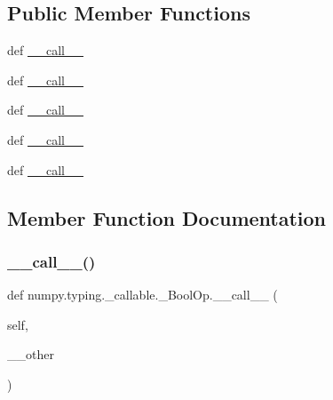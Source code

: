 \subsection*{Public Member Functions}
\begin{DoxyCompactItemize}
\item 
def \hyperlink{classnumpy_1_1typing_1_1__callable_1_1__BoolOp_af99dcaaa1aa2881d3ed4ad2f8663d85e}{\+\_\+\+\_\+call\+\_\+\+\_\+}
\item 
def \hyperlink{classnumpy_1_1typing_1_1__callable_1_1__BoolOp_af99dcaaa1aa2881d3ed4ad2f8663d85e}{\+\_\+\+\_\+call\+\_\+\+\_\+}
\item 
def \hyperlink{classnumpy_1_1typing_1_1__callable_1_1__BoolOp_af99dcaaa1aa2881d3ed4ad2f8663d85e}{\+\_\+\+\_\+call\+\_\+\+\_\+}
\item 
def \hyperlink{classnumpy_1_1typing_1_1__callable_1_1__BoolOp_af99dcaaa1aa2881d3ed4ad2f8663d85e}{\+\_\+\+\_\+call\+\_\+\+\_\+}
\item 
def \hyperlink{classnumpy_1_1typing_1_1__callable_1_1__BoolOp_af99dcaaa1aa2881d3ed4ad2f8663d85e}{\+\_\+\+\_\+call\+\_\+\+\_\+}
\end{DoxyCompactItemize}


\subsection{Member Function Documentation}
\mbox{\label{classnumpy_1_1typing_1_1__callable_1_1__BoolOp_af99dcaaa1aa2881d3ed4ad2f8663d85e}} 
\subsubsection{\texorpdfstring{\+\_\+\+\_\+call\+\_\+\+\_\+()}{\_\_call\_\_()}\hspace{0.1cm}{\footnotesize\ttfamily [1/5]}}
{\footnotesize\ttfamily def numpy.\+typing.\+\_\+callable.\+\_\+\+Bool\+Op.\+\_\+\+\_\+call\+\_\+\+\_\+ (\begin{DoxyParamCaption}\item[{}]{self,  }\item[{}]{\+\_\+\+\_\+other }\end{DoxyParamCaption})}

